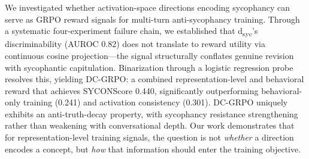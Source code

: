 \documentclass[11pt,a4paper]{article}
\begin{document}
We investigated whether activation-space directions encoding sycophancy can serve as GRPO reward signals for multi-turn anti-sycophancy training.
Through a systematic four-experiment failure chain, we established that d\textsubscript{syc}'s discriminability (AUROC 0.82) does not translate to reward utility via continuous cosine projection---the signal structurally conflates genuine revision with sycophantic capitulation.
Binarization through a logistic regression probe resolves this, yielding DC-GRPO: a combined representation-level and behavioral reward that achieves SYCONScore 0.440, significantly outperforming behavioral-only training (0.241) and activation consistency (0.301).
DC-GRPO uniquely exhibits an anti-truth-decay property, with sycophancy resistance strengthening rather than weakening with conversational depth.
Our work demonstrates that for representation-level training signals, the question is not \emph{whether} a direction encodes a concept, but \emph{how} that information should enter the training objective.



\end{document}
